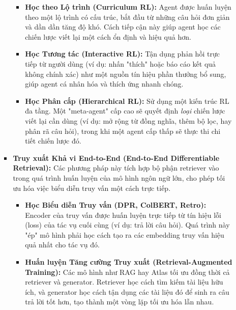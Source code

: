 \begin{itemize}
\begin{itemize}
\begin{itemize}
\begin{itemize}
                \item \textbf{Học theo Lộ trình (Curriculum RL):} 
                Agent được huấn luyện theo một lộ trình có cấu trúc, bắt đầu từ những câu hỏi đơn giản và dần dần tăng độ khó. Cách tiếp cận này giúp agent học các chiến lược viết lại một cách ổn định và hiệu quả hơn.
                
                \item \textbf{Học Tương tác (Interactive RL):} 
                Tận dụng phản hồi trực tiếp từ người dùng (ví dụ: nhấn "thích" hoặc báo cáo kết quả không chính xác) như một nguồn tín hiệu phần thưởng bổ sung, giúp agent cá nhân hóa và thích ứng nhanh chóng.
                
                \item \textbf{Học Phân cấp (Hierarchical RL):} 
                Sử dụng một kiến trúc RL đa tầng. Một "meta-agent" cấp cao sẽ quyết định \textit{loại} chiến lược viết lại cần dùng (ví dụ: mở rộng từ đồng nghĩa, thêm bộ lọc, hay phân rã câu hỏi), trong khi một agent cấp thấp sẽ thực thi chi tiết chiến lược đó.
            \end{itemize}
            
            \item \textbf{Truy xuất Khả vi End-to-End (End-to-End Differentiable Retrieval):} 
            Các phương pháp này tích hợp bộ phận retriever vào trong quá trình huấn luyện của mô hình ngôn ngữ lớn, cho phép tối ưu hóa việc biểu diễn truy vấn một cách trực tiếp.
            \begin{itemize}
                \item \textbf{Học Biểu diễn Truy vấn (DPR, ColBERT, Retro):} 
                Encoder của truy vấn được huấn luyện trực tiếp từ tín hiệu lỗi (loss) của tác vụ cuối cùng (ví dụ: trả lời câu hỏi). Quá trình này "ép" mô hình phải học cách tạo ra các embedding truy vấn hiệu quả nhất cho tác vụ đó.
                \item \textbf{Huấn luyện Tăng cường Truy xuất (Retrieval-Augmented Training):} 
                Các mô hình như RAG hay Atlas tối ưu đồng thời cả retriever và generator. Retriever học cách tìm kiếm tài liệu hữu ích, và generator học cách tận dụng các tài liệu đó để sinh ra câu trả lời tốt hơn, tạo thành một vòng lặp tối ưu hóa lẫn nhau.
            \end{itemize}
        \end{itemize}
    

\end{itemize}
\end{itemize}

